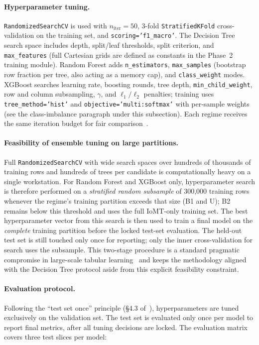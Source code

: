 \paragraph{Hyperparameter tuning.}
\texttt{RandomizedSearchCV} is used with $n_{\text{iter}}=50$, 3-fold \texttt{StratifiedKFold} cross-validation on the training set, and \texttt{scoring='f1\_macro'}. The Decision Tree search space includes depth, split/leaf thresholds, split criterion, and \texttt{max\_features} (full Cartesian grids are defined as constants in the Phase~2 training module). Random Forest adds \texttt{n\_estimators}, \texttt{max\_samples} (bootstrap row fraction per tree, also acting as a memory cap), and \texttt{class\_weight} modes. XGBoost searches learning rate, boosting rounds, tree depth, \texttt{min\_child\_weight}, row and column subsampling, $\gamma$, and $\ell_1/\ell_2$ penalties; training uses \texttt{tree\_method='hist'} and \texttt{objective='multi:softmax'} with per-sample weights (see the class-imbalance paragraph under this subsection). Each regime receives the same iteration budget for fair comparison~\cite{lones2024avoid}.

\paragraph{Feasibility of ensemble tuning on large partitions.}
Full \texttt{RandomizedSearchCV} with wide search spaces over hundreds of thousands of training rows and hundreds of trees per candidate is computationally heavy on a single workstation. For Random Forest and XGBoost only, hyperparameter search is therefore performed on a \emph{stratified random subsample} of 300{,}000 training rows whenever the regime's training partition exceeds that size (B1 and U); B2 remains below this threshold and uses the full IoMT-only training set. The best hyperparameter vector from this search is then used to train a final model on the \emph{complete} training partition before the locked test-set evaluation. The held-out test set is still touched only once for reporting; only the inner cross-validation for search uses the subsample. This two-stage procedure is a standard pragmatic compromise in large-scale tabular learning~\cite{lones2024avoid} and keeps the methodology aligned with the Decision Tree protocol aside from this explicit feasibility constraint.

\paragraph{Evaluation protocol.}
Following the ``test set once'' principle (\S4.3 of~\cite{lones2024avoid}), hyperparameters are tuned exclusively on the validation set. The test set is evaluated only once per model to report final metrics, after all tuning decisions are locked. The evaluation matrix covers three test slices per model:

